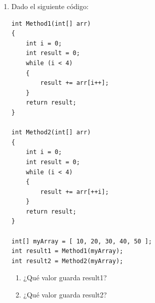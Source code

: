 \begin{enumerate}
\item Dado el siguiente código:
\begin{lstlisting}
int Method1(int[] arr)
{
    int i = 0;
    int result = 0;
    while (i < 4)
    {
        result += arr[i++];
    }
    return result;
}

int Method2(int[] arr)
{
    int i = 0;
    int result = 0;
    while (i < 4)
    {
        result += arr[++i];
    }
    return result;
}

int[] myArray = [ 10, 20, 30, 40, 50 ];
int result1 = Method1(myArray);
int result2 = Method2(myArray);
\end{lstlisting}

\begin{enumerate}
    \item ¿Qué valor guarda result1?
    \item ¿Qué valor guarda result2?
\end{enumerate}

\end{enumerate}
